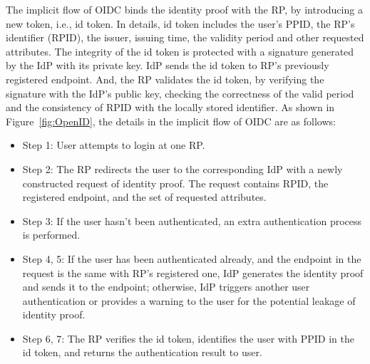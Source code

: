 The implicit flow of OIDC binds the  identity proof with the RP, by introducing a new token, i.e., id token.
In details, id token includes the user's PPID, the RP's identifier (RPID), the issuer, issuing time, the validity period and other requested attributes.
The integrity of the id token is protected with a signature generated by the IdP with its private key.
IdP 
sends the id token to RP's previously registered endpoint. 
And, the RP validates the id token, by verifying the signature with the IdP's public key, checking the correctness of the valid period and the consistency of RPID with the locally stored identifier. As shown in Figure~\ref{fig:OpenID}, the details in the implicit flow of OIDC are as follows:
\begin{itemize}
    \item Step 1: User attempts to login at one RP.
    \item Step 2: The RP redirects the user to the corresponding IdP with a newly constructed request of identity proof. The request contains RPID, the registered endpoint, and the set of requested attributes.
    \item Step 3: If the user hasn't been authenticated, an extra authentication process is performed.
    \item Step 4, 5: If the user has been authenticated already, and the endpoint in the request is the same with RP's registered one,
     IdP generates the identity proof and sends it to the endpoint; otherwise, IdP triggers another user authentication or provides a warning to the user for the potential leakage of identity proof.
    \item Step 6, 7: The RP verifies the id token, identifies the user with PPID in the id token, and returns the authentication result to user.
\end{itemize}

